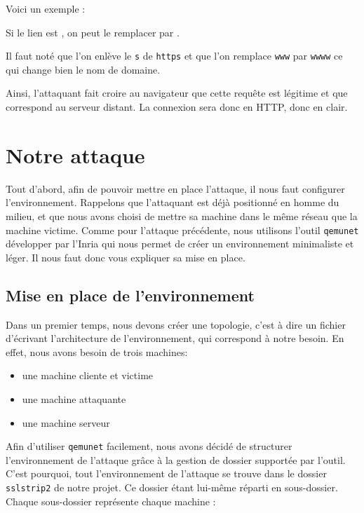 Voici un exemple :

Si le lien est  , on peut le remplacer par .

Il faut noté que l'on enlève le \verb+s+ de \verb+https+ et que l'on remplace \verb+www+ par \verb+wwww+ ce qui change bien le nom de domaine.

Ainsi, l'attaquant fait croire au navigateur que cette requête est légitime et que  correspond au serveur distant. La connexion sera donc en HTTP, donc en clair.

\section{Notre attaque}

Tout d'abord, afin de pouvoir mettre en place l'attaque, il nous faut configurer l'environnement. Rappelons que l'attaquant est déjà positionné en homme du milieu, et que nous avons choisi de mettre sa machine dans le même réseau que la machine victime. Comme pour l'attaque précédente, nous utilisons l'outil \verb+qemunet+ développer par l'Inria qui nous permet de créer un environnement minimaliste et léger. Il nous faut donc vous expliquer sa mise en place.

\subsection{Mise en place de l'environnement}

Dans un premier temps, nous devons créer une topologie, c'est à dire un fichier d'écrivant l'architecture de l'environnement, qui correspond à notre besoin. En effet, nous avons besoin de trois machines:

\begin{itemize}
\item une machine cliente et victime
\item une machine attaquante
\item une machine serveur
\end{itemize}


Afin d'utiliser \verb+qemunet+ facilement, nous avons décidé de structurer l'environnement de l'attaque grâce à la gestion de dossier supportée par l'outil. C'est pourquoi, tout l'environnement de l'attaque se trouve dans le dossier \verb+sslstrip2+ de notre projet. Ce dossier étant lui-même réparti en sous-dossier. Chaque sous-dossier représente chaque machine :

